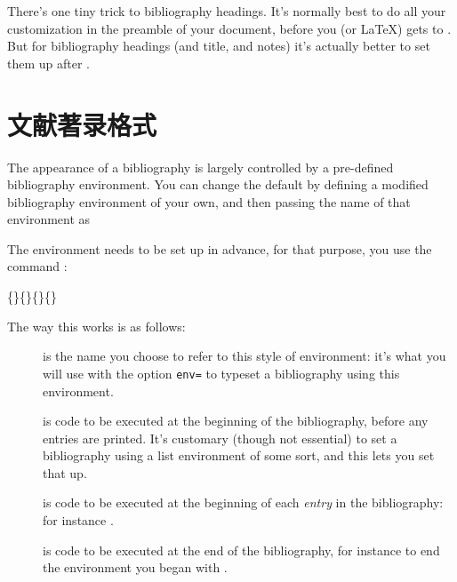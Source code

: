 There's one tiny trick to bibliography headings. It's normally best to
do all your customization in the preamble of your document, before you
(or \LaTeX) gets to . But for bibliography
headings (and title, and notes) it's actually better to set them up
after .

\section{文献著录格式}

The appearance of a bibliography is largely controlled by a
pre-defined bibliography environment. You can change the default by
defining a modified bibliography environment of your own, and then
passing the name of that environment as
\begin{center}
\end{center}

The environment needs to be set up in advance, for that purpose, you
use the command :
\begin{pseudoverb}
\{\}\{\}\{\}\{\}
\end{pseudoverb}
The way this works is as follows:
\begin{description}
\item[] is the name you choose to refer to this style of
  environment: it's what you will use with the option \texttt{env=} to
  typeset a bibliography using this environment.
\item[] is code to be executed at the beginning of the
  bibliography, before any entries are printed. It's customary (though
  not essential) to set a bibliography using a list environment of
  some sort, and this lets you set that up.
\item[] is code to be executed at the beginning of each
  \emph{entry} in the bibliography: for instance .
\item[] is code to be executed at the end of the
  bibliography, for instance to end the environment you began with
  .
\end{description}

